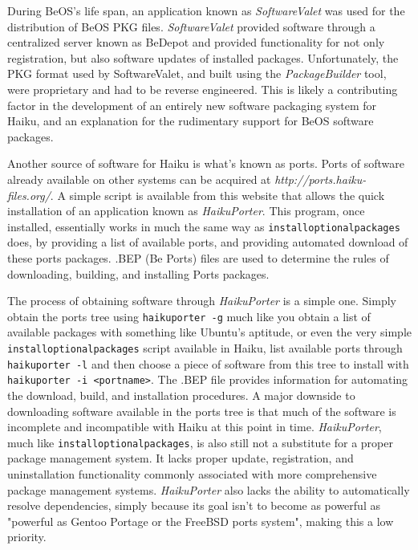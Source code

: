 \documentclass{article}
\begin{document}
During BeOS's life span, an application known as \textit{SoftwareValet} was used for the distribution of BeOS PKG files. \textit{SoftwareValet} provided software through a centralized server known as BeDepot\cite{SoftwareValet} and provided functionality for not only registration, but also software updates of installed packages. Unfortunately, the PKG format used by SoftwareValet, and built using the \textit{PackageBuilder} tool, were proprietary and had to be reverse engineered.\cite{OpeningPkgFiles} This is likely a contributing factor in the development of an entirely new software packaging system for Haiku, and an explanation for the rudimentary support for BeOS software packages.

Another source of software for Haiku is what's known as ports. Ports of software already available on other systems can be acquired at \textit{http://ports.haiku-files.org/}. A simple script is available from this website that allows the quick installation of an application known as \textit{HaikuPorter}. This program, once installed, essentially works in much the same way as \texttt{installoptionalpackages} does, by providing a list of available ports, and providing automated download of these ports packages. .BEP (Be Ports) files are used to determine the rules of downloading, building, and installing Ports packages.\cite{BepFiles}

The process of obtaining software through \textit{HaikuPorter} is a simple one. Simply obtain the ports tree using \texttt{haikuporter -g} much like you obtain a list of available packages with something like Ubuntu's aptitude, or even the very simple \texttt{installoptionalpackages} script available in Haiku, list available ports through \texttt{haikuporter -l} and then choose a piece of software from this tree to install with \texttt{haikuporter -i <portname>}. The .BEP file provides information for automating the download, build, and installation procedures.\cite{BepFiles} A major downside to downloading software available in the ports tree is that much of the software is incomplete and incompatible with Haiku at this point in time. \textit{HaikuPorter}, much like \texttt{installoptionalpackages}, is also still not a substitute for a proper package management system. It lacks proper update, registration, and uninstallation functionality commonly associated with more comprehensive package management systems. \textit{HaikuPorter} also lacks the ability to automatically resolve dependencies, simply because its goal isn't to become as powerful as "powerful as Gentoo Portage or the FreeBSD ports system", making this a low priority.\cite{HaikuPorter}
\end{document}
